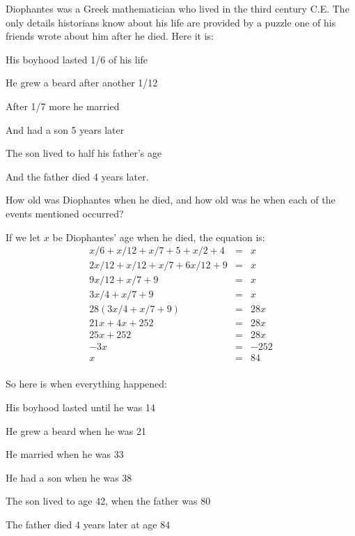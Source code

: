 \documentclass[fleqn,addpoints]{exam}
\begin{document}
\begin{questions}

\question
Diophantes was a Greek mathematician who lived in the third century C.E.  The only details historians know about his
life are provided by a puzzle one of his friends wrote about him after he died.  Here it is:

\begin{itemize*}
  \item His boyhood lasted 1/6 of his life
  \item He grew a beard after another 1/12
  \item After 1/7 more he married
  \item And had a son 5 years later
  \item The son lived to half his father's age
  \item And the father died 4 years later.
\end{itemize*}

How old was Diophantes when he died, and how old was he when each of the events mentioned occurred?

\begin{solution}
If we let $x$ be Diophantes' age when he died, the equation is:
\begin{eqnarray*}
  x/6 + x/12 + x/7 + 5 + x/2 + 4 &=& x \\
  2x/12 + x/12 + x/7 + 6x/12 + 9 &=& x \\
  9x/12 + x/7 + 9 &=& x \\
  3x/4 + x/7 + 9 &=& x \\
  28(3x/4 + x/7 + 9) &=& 28x \\
  21x + 4x + 252 &=& 28x \\
  25x + 252 &=& 28x \\
  -3x &=& -252 \\
  x &=& 84 \\
\end{eqnarray*}

So here is when everything happened:
\begin{itemize*}
  \item His boyhood lasted until he was 14
  \item He grew a beard when he was 21 
  \item He married when he was 33
  \item He had a son when he was 38
  \item The son lived to age 42, when the father was 80
  \item The father died 4 years later at age 84
\end{itemize*}


\end{solution}
\end{questions}
\end{document}
